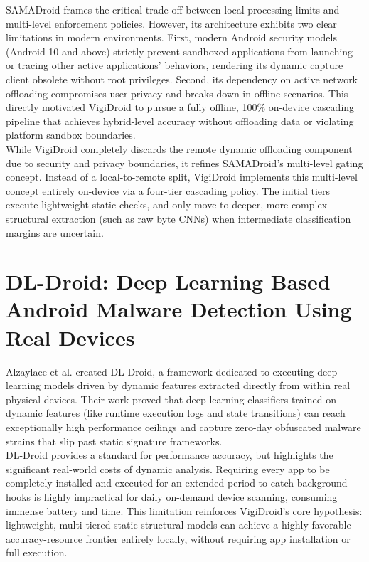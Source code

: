 SAMADroid frames the critical trade-off between local processing limits and multi-level enforcement policies. However, its architecture exhibits two clear limitations in modern environments. First, modern Android security models (Android 10 and above) strictly prevent sandboxed applications from launching or tracing other active applications' behaviors, rendering its dynamic capture client obsolete without root privileges. Second, its dependency on active network offloading compromises user privacy and breaks down in offline scenarios. This directly motivated VigiDroid to pursue a fully offline, 100\% on-device cascading pipeline that achieves hybrid-level accuracy without offloading data or violating platform sandbox boundaries.\\

 While VigiDroid completely discards the remote dynamic offloading component due to security and privacy boundaries, it refines SAMADroid's multi-level gating concept. Instead of a local-to-remote split, VigiDroid implements this multi-level concept entirely on-device via a four-tier cascading policy. The initial tiers execute lightweight static checks, and only move to deeper, more complex structural extraction (such as raw byte CNNs) when intermediate classification margins are uncertain.

\section{ DL-Droid: Deep Learning Based Android Malware Detection Using Real Devices}
Alzaylaee et al. \cite{dldroid}created DL-Droid, a framework dedicated to executing deep learning models driven by dynamic features extracted directly from within real physical devices. Their work proved that deep learning classifiers trained on dynamic features (like runtime execution logs and state transitions) can reach exceptionally high performance ceilings and capture zero-day obfuscated malware strains that slip past static signature frameworks.\\

 DL-Droid provides a standard for performance accuracy, but highlights the significant real-world costs of dynamic analysis. Requiring every app to be completely installed and executed for an extended period to catch background hooks is highly impractical for daily on-demand device scanning, consuming immense battery and time. This limitation reinforces VigiDroid’s core hypothesis: lightweight, multi-tiered static structural models can achieve a highly favorable accuracy-resource frontier entirely locally, without requiring app installation or full execution.\\


